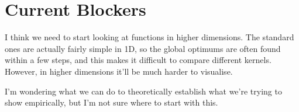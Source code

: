 \documentclass[a4paper]{article}
\begin{document}
\section{Current Blockers}
I think we need to start looking at functions in higher dimensions.
The standard ones are actually fairly simple in 1D, so the global optimums are often found within a few steps, and this makes it difficult to compare different kernels.
However, in higher dimensions it'll be much harder to visualise.

I'm wondering what we can do to theoretically establish what we're trying to show empirically, but I'm not sure where to start with this.
\end{document}
